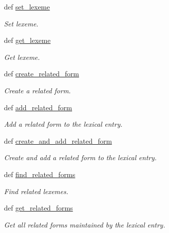 \begin{DoxyCompactItemize}
def \hyperlink{classlmf_1_1src_1_1core_1_1lexical__entry_1_1_lexical_entry_a0720cfa82decbc27a30d4830c1e8cbf2}{set\+\_\+lexeme}
\begin{DoxyCompactList}\small\item\em Set lexeme. \end{DoxyCompactList}\item 
def \hyperlink{classlmf_1_1src_1_1core_1_1lexical__entry_1_1_lexical_entry_a351a470c736be8b896354d27f56e1833}{get\+\_\+lexeme}
\begin{DoxyCompactList}\small\item\em Get lexeme. \end{DoxyCompactList}\item 
def \hyperlink{classlmf_1_1src_1_1core_1_1lexical__entry_1_1_lexical_entry_ac3b6d197ee90f1aec5b61e24613c091f}{create\+\_\+related\+\_\+form}
\begin{DoxyCompactList}\small\item\em Create a related form. \end{DoxyCompactList}\item 
def \hyperlink{classlmf_1_1src_1_1core_1_1lexical__entry_1_1_lexical_entry_a9078d381fea92a4d1d3f57b391a2b5b7}{add\+\_\+related\+\_\+form}
\begin{DoxyCompactList}\small\item\em Add a related form to the lexical entry. \end{DoxyCompactList}\item 
def \hyperlink{classlmf_1_1src_1_1core_1_1lexical__entry_1_1_lexical_entry_a46576799af0465084051e3c2957afa3c}{create\+\_\+and\+\_\+add\+\_\+related\+\_\+form}
\begin{DoxyCompactList}\small\item\em Create and add a related form to the lexical entry. \end{DoxyCompactList}\item 
def \hyperlink{classlmf_1_1src_1_1core_1_1lexical__entry_1_1_lexical_entry_ac89bb82f0afe4e1566f34379f3a188da}{find\+\_\+related\+\_\+forms}
\begin{DoxyCompactList}\small\item\em Find related lexemes. \end{DoxyCompactList}\item 
def \hyperlink{classlmf_1_1src_1_1core_1_1lexical__entry_1_1_lexical_entry_aee5b118b1015a35a5e8426235d325291}{get\+\_\+related\+\_\+forms}
\begin{DoxyCompactList}\small\item\em Get all related forms maintained by the lexical entry. \end{DoxyCompactList}\item 

\end{DoxyCompactItemize}
